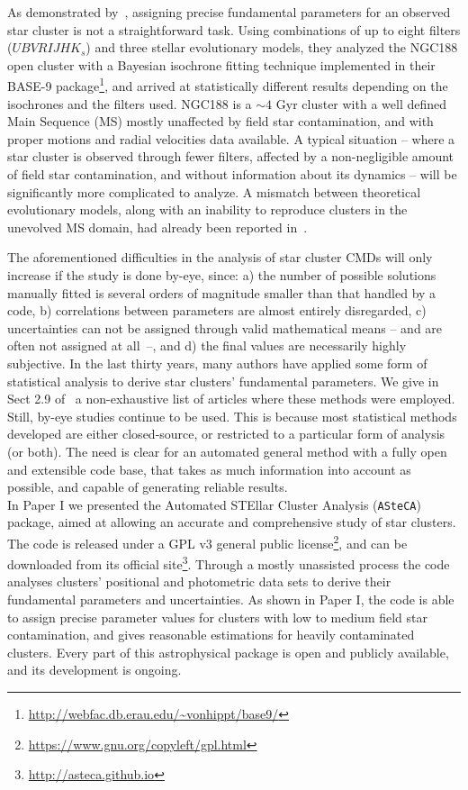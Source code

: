 \documentclass[draft]{aa}
\begin{document}
As demonstrated by~\cite{Hills_2015}, assigning precise fundamental
parameters for an observed star cluster is not a straightforward task.
Using combinations of up to eight filters ($UBVRIJHK_s$) and three stellar
evolutionary models, they analyzed the NGC188 open cluster with a
Bayesian isochrone fitting technique implemented in their 
BASE-9 package\footnote{\url{http://webfac.db.erau.edu/~vonhippt/base9/}}, and
arrived at statistically different results depending on the isochrones and the
filters used.
%
NGC188 is a ${\sim}4$ Gyr cluster with a well defined Main Sequence (MS) mostly
unaffected by field star contamination, and with proper motions and radial
velocities data available.
A typical situation -- where a star cluster is observed through fewer
filters, affected by a non-negligible amount of field star contamination, and
without information about its dynamics -- will be significantly more
complicated to analyze.
%
A mismatch between theoretical evolutionary models, along with an
inability to reproduce clusters in the unevolved MS domain, had already
been reported in~\cite{Grocholski_2003}.

The aforementioned difficulties in the analysis of star cluster CMDs will only
increase if the study is done by-eye, since: a) the number of possible solutions
manually fitted is several orders of magnitude smaller than that handled by a
code, b) correlations between parameters are almost entirely disregarded, c)
uncertainties can not be assigned through valid mathematical
means -- and are often not assigned at \mbox{all --}, and d) the final values
are necessarily highly subjective.
%
In the last thirty years, many authors have applied some form of
statistical analysis to derive star clusters' fundamental parameters.
We give in Sect 2.9 of~\citet[][hereafter Paper I]{Perren_2015} a non-exhaustive
list of articles where these methods were employed.
%
Still, by-eye studies continue to be used. This is because most statistical
methods developed are either closed-source, or restricted to a particular form
of analysis (or both).
%
The need is clear for an automated general method with a fully open
and extensible code base, that takes as much information into account as
possible, and capable of generating reliable results.\\

In Paper I we presented the Automated STEllar Cluster Analysis
(\texttt{ASteCA}) package, aimed at allowing an accurate and comprehensive study
of star clusters.
The code is released under a GPL v3 general public
license\footnote{\url{https://www.gnu.org/copyleft/gpl.html}}, and
can be downloaded from its official
site\footnote{\url{http://asteca.github.io}}.
%
Through a mostly unassisted process the code analyses clusters' positional
and photometric data sets to derive their fundamental parameters and
uncertainties.
As shown in Paper I, the code is able to assign precise parameter values for
clusters with low to medium field star contamination, and gives reasonable
estimations for heavily contaminated clusters. Every part of this astrophysical
package is open and publicly available, and its development is ongoing.
\end{document}
